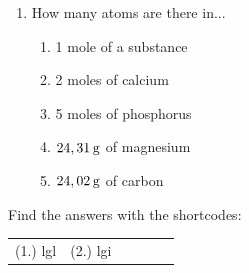 \begin{enumerate}[noitemsep, label=\textbf{\arabic*}. ]
\begin{table}[H]
\begin{center}
      \end{center}
    \begin{center}{\small\bfseries Table 18.1}\end{center}
    \begin{caption}{\small\bfseries Table 18.1}\end{caption}
\end{table}
    \par
          \label{m38717*uid3}\item 
How many atoms are there in...
\label{m38717*id276311}\begin{enumerate}[noitemsep, label=\textbf{\alph*}. ] 
            \label{m38717*uid4}\item 1 mole of a substance
\label{m38717*uid5}\item 2 moles of calcium
\label{m38717*uid6}\item 5 moles of phosphorus
\label{m38717*uid7}\item $24,31\phantom{\rule{2pt}{0ex}}\mathrm{g}$ of magnesium
\label{m38717*uid8}\item $24,02\phantom{\rule{2pt}{0ex}}\mathrm{g}$ of carbon
\end{enumerate}
                \end{enumerate}
    \label{m38717*cid3}
\par {} Find the answers with the shortcodes:
 \par \begin{tabular}[h]{cccccc}
 (1.) lgl  &  (2.) lgi  & \end{tabular}
